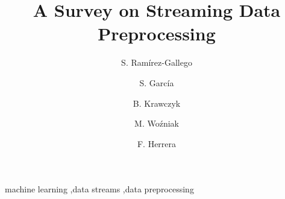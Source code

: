 \documentclass[preprint,12pt]{elsarticle}
\begin{document}
\begin{frontmatter}



\title{A Survey on Streaming Data Preprocessing}


\author[ugr]{S. Ram\'{i}rez-Gallego}

\author[ugr]{S. Garc\'ia}

\author[pwr]{B. Krawczyk}

\author[pwr]{M. Wo\'zniak}

\author[ugr]{F. Herrera}

\address[ugr]{Department of Computer Science and Artificial Intelligence, CITIC-UGR, University of Granada, 18071 Granada, Spain}
	
\address[pwr]{Department of Computer Science, Wroc\l{}aw University of Technology, Wyb. Wyspianskiego 27, 50-370 Wroc\l{}aw, Poland}


\begin{abstract}

\end{abstract}

\begin{keyword}



machine learning \sep data streams \sep data preprocessing

\end{keyword}

\end{frontmatter}
\end{document}

